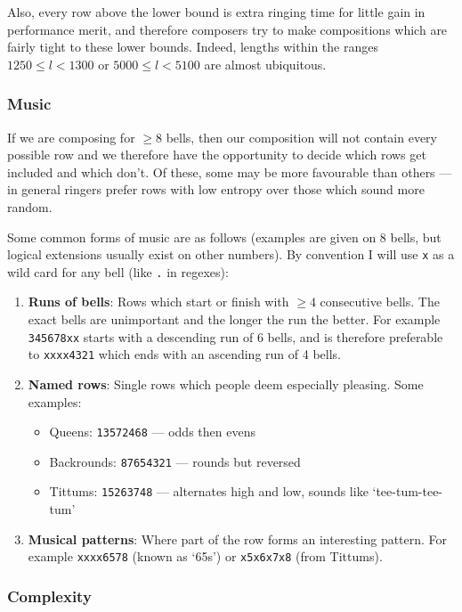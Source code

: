 \documentclass[12pt]{article}
\newcommand{\row}[1]{\texttt{#1}}
\begin{document}
Also, every row above the lower bound is extra ringing time for little gain in performance merit,
and therefore composers try to make compositions which are fairly tight to these lower bounds.
Indeed, lengths within the ranges $1250 \le l < 1300$ or $5000 \le l < 5100$ are almost ubiquitous.

\subsubsection{Music}

If we are composing for $\ge 8$ bells, then our composition will not contain every possible row and
we therefore have the opportunity to decide which rows get included and which don't.  Of these, some
may be more favourable than others --- in general ringers prefer rows with low entropy over those
which sound more random.

Some common forms of music are as follows (examples are given on 8 bells, but logical extensions
usually exist on other numbers).  By convention I will use \row{x} as a wild card for any bell (like
\verb"." in regexes):

\begin{enumerate}
    \item \textbf{Runs of bells}: Rows which start or finish with $\ge 4$ consecutive bells.
        The exact bells are unimportant and the longer the run the better.  For example
        \row{345678xx} starts with a descending run of 6 bells, and is therefore preferable to
        \row{xxxx4321} which ends with an ascending run of 4 bells.
    \item \textbf{Named rows}: Single rows which people deem especially pleasing.  Some examples:
        \begin{itemize}
            \item Queens: \row{13572468} --- odds then evens
            \item Backrounds: \row{87654321} --- rounds but reversed
            \item Tittums: \row{15263748} --- alternates high and low, sounds like `tee-tum-tee-tum'
        \end{itemize}
    \item \textbf{Musical patterns}: Where part of the row forms an interesting pattern.  For
        example \row{xxxx6578} (known as `65s') or \row{x5x6x7x8} (from Tittums).
\end{enumerate}

\subsubsection{Complexity}
\end{document}
